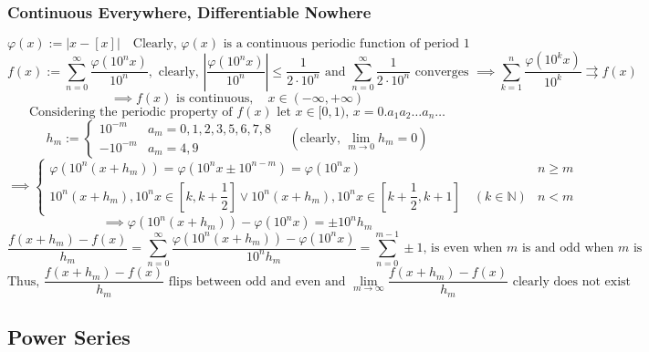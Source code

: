 \documentclass{article}
\newcommand{\N}{\mathbb{N}}
\newcommand{\ucov}{\rightrightarrows}
\newcommand{\he}{\mbox{ and }}
\newcommand{\0}{{\bf{0}}}
\begin{document}
\subsubsection{Continuous Everywhere, Differentiable Nowhere}
$$\varphi(x):=|x-[x]|\quad\mbox{Clearly, $\varphi(x)$ is a continuous periodic function of period 1}$$
$$f(x):=\sum_{n=0}^\infty\frac{\varphi(10^nx)}{10^n},\mbox{ clearly, }\left|\frac{\varphi(10^nx)}{10^n}\right|\le\frac{1}{2\cdot10^n}\he\sum_{n=0}^\infty\frac{1}{2\cdot10^n}\mbox{ converges }\implies\sum_{k=1}^n\frac{\varphi(10^kx)}{10^k}\ucov f(x)$$
$$\implies f(x)\mbox{ is continuous},\quad x\in(-\infty,+\infty)$$
$$\mbox{Considering the periodic property of }f(x)\mbox{ let }x\in[0,1),\,x=0.a_1a_2\dots a_n\dots$$
$$h_m:=\begin{cases}
    10^{-m}&a_m=0,1,2,3,5,6,7,8\\
    -10^{-m}&a_m=4,9
\end{cases}\quad\left(\mbox{clearly, }\lim_{m\to0}h_m=0\right)$$
$$\implies\begin{cases}
    \varphi(10^n(x+h_m))=\varphi(10^nx\pm10^{n-m})=\varphi(10^nx)&n\geq m\\
    10^n(x+h_m),10^nx\in\left[k,k+\dfrac{1}{2}\right]\lor10^n(x+h_m),10^nx\in\left[k+\dfrac{1}{2},k+1\right]\quad(k\in\N)&n<m
\end{cases}$$
$$\implies\varphi(10^n(x+h_m))-\varphi(10^nx)=\pm10^nh_m$$
$$\frac{f(x+h_m)-f(x)}{h_m}=\sum_{n=0}^\infty\frac{\varphi(10^n(x+h_m))-\varphi(10^nx)}{10^nh_m}=\sum_{n=0}^{m-1}\pm1\mbox{, is even when $m$ is and odd when $m$ is}$$
$$\mbox{Thus, }\frac{f(x+h_m)-f(x)}{h_m}\mbox{ flips between odd and even and }\lim_{m\to\infty}\frac{f(x+h_m)-f(x)}{h_m}\mbox{ clearly does not exist}$$
\subsection{Power Series}
\end{document}
